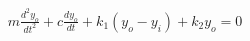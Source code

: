 \documentclass[preview]{standalone}
\begin{document}
\begin{align*}
m\frac{d^2y_o}{dt^2} + c\frac{dy_o}{dt} + k_1(y_o-y_i) + k_2y_o = 0
\end{align*}
\end{document}
